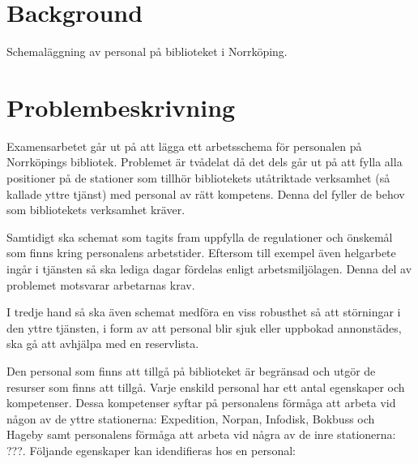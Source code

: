 

\section{Background} 
Schemaläggning av personal på biblioteket i Norrköping.

\section{Problembeskrivning}
Examensarbetet går ut på att lägga ett arbetsschema för personalen på Norrköpings bibliotek. Problemet är tvådelat då det dels går ut på att fylla alla positioner på de stationer som tillhör bibliotekets utåtriktade verksamhet (så kallade yttre tjänst) med personal av rätt kompetens. Denna del fyller de behov som bibliotekets verksamhet kräver.

Samtidigt ska schemat som tagits fram uppfylla de regulationer och önskemål som finns kring personalens arbetstider. Eftersom till exempel även helgarbete ingår i tjänsten så ska lediga dagar fördelas enligt arbetsmiljölagen. Denna del av problemet motsvarar arbetarnas krav.

I tredje hand så ska även schemat medföra en viss robusthet så att störningar i den yttre tjänsten, i form av att personal blir sjuk eller uppbokad annonstädes, ska gå att avhjälpa med en reservlista. 

Den personal som finns att tillgå på biblioteket är begränsad och utgör de resurser som finns att tillgå. Varje enskild personal har ett antal egenskaper och kompetenser. Dessa kompetenser syftar på personalens förmåga att arbeta vid någon av de yttre stationerna: Expedition, Norpan, Infodisk, Bokbuss och Hageby samt personalens förmåga att arbeta vid några av de inre stationerna: ???. Följande egenskaper kan idendifieras hos en personal: \\

